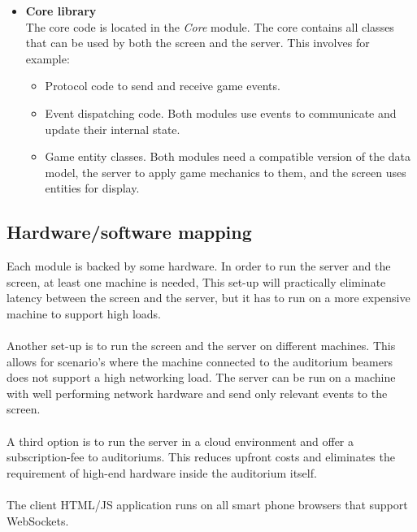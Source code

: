 \documentclass[11pt,a4paper]{article}
\begin{document}
\begin{itemize}
\item \textbf{Core library} \\
The core code is located in the \emph{Core} module. The core contains all classes that can be used by both the screen and the server. This involves for example:
\begin{itemize}
\item Protocol code to send and receive game events.
\item Event dispatching code. Both modules use events to communicate and update their internal state.
\item Game entity classes. Both modules need a compatible version of the data model, the server to apply game mechanics to them, and the screen uses entities for display.
\end{itemize}

\end{itemize}

\subsection{Hardware/software mapping}
Each module is backed by some hardware. In order to run the server and the screen, at least one machine is needed, This set-up will practically eliminate latency between the screen and the server, but it has to run on a more expensive machine to support high loads.\\
\\
Another set-up is to run the screen and the server on different machines. This allows for scenario's where the machine connected to the auditorium beamers does not support a high networking load. The server can be run on a machine with well performing network hardware and send only relevant events to the screen.\\
\\
A third option is to run the server in a cloud environment and offer a subscription-fee to auditoriums. This reduces upfront costs and eliminates the requirement of high-end hardware inside the auditorium itself.\\
\\
The client HTML/JS application runs on all smart phone browsers that support WebSockets. 
\\
\newpage
\end{document}
